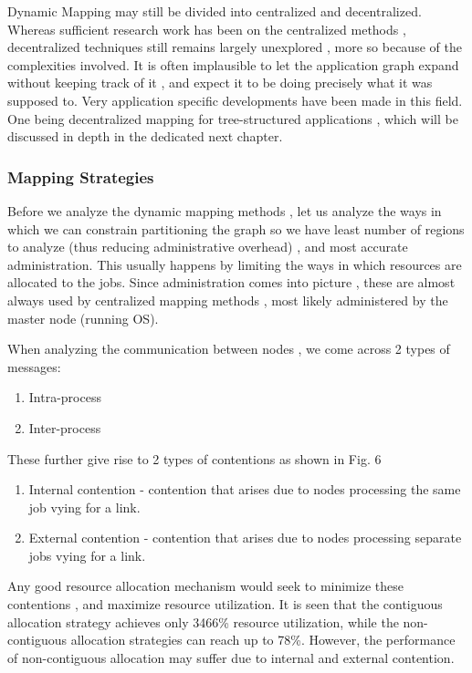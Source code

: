 Dynamic Mapping may still be divided into centralized and decentralized.
Whereas sufficient research work has been on the centralized methods
, decentralized techniques still remains largely unexplored , more
so because of the complexities involved. It is often implausible to
let the application graph expand without keeping track of it , and
expect it to be doing precisely what it was supposed to. Very application
specific developments have been made in this field. One being decentralized
mapping for tree-structured applications , which will be discussed
in depth in the dedicated next chapter.


\subsubsection{Mapping Strategies}

Before we analyze the dynamic mapping methods , let us analyze the
ways in which we can constrain partitioning the graph so we have least
number of regions to analyze (thus reducing administrative overhead)
, and most accurate administration. This usually happens by limiting
the ways in which resources are allocated to the jobs. Since administration
comes into picture , these are almost always used by centralized mapping
methods , most likely administered by the master node (running OS).

When analyzing the communication between nodes , we come across 2
types of messages:
\begin{enumerate}
\item Intra-process
\item Inter-process
\end{enumerate}
These further give rise to 2 types of contentions as shown in Fig.
6
\begin{enumerate}
\item Internal contention - contention that arises due to nodes processing
the same job vying for a link.
\item External contention - contention that arises due to nodes processing
separate jobs vying for a link.
\end{enumerate}
Any good resource allocation mechanism would seek to minimize these
contentions , and maximize resource utilization. It is seen that the
contiguous allocation strategy achieves only 34\textendash{}66\% resource
utilization, while the non-contiguous allocation strategies can reach
up to 78\%. However, the performance of non-contiguous allocation
may suffer due to internal and external contention.

